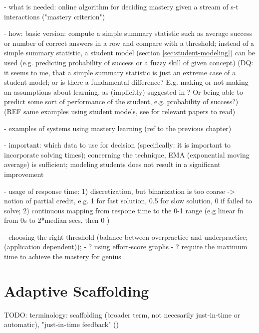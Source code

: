 - what is needed: online algorithm for deciding mastery given a stream of s-t interactions ("mastery criterion")

- how: basic version: compute a simple summary statistic such as average
success or number of correct answers in a row and compare with a threshold;
instead of a simple summary statistic, a student model (section
\ref{sec:student-modeling}) can be used (e.g. predicting probability of success
or a fuzzy skill of given concept)
(DQ: it seems to me, that a simple summary statistic is just an extreme case of
a student model; or is there a fundamental difference? E.g. making or not
making an assumptions about learning, as (implicitly) suggested in \cite{alg.mastery}?
Or being able to predict some sort of performance of the student, e.g. probability of
success?)
(REF same examples using student models, see \cite{alg.mastery} for relevant
papers to read)

- examples of systems using mastery learning (ref to the previous chapter)

- important: which data to use for decision (specifically: it is important to
incorporate solving times); concerning the technique, EMA (exponential moving
average) is sufficient; modeling students does not result in a significant
improvement \cite{alg.mastery}

- usage of response time:
1) discretization, but binarization is too coarse
-> notion of partial credit, e.g. 1 for fast solution, 0.5 for slow solution,
0 if failed to solve;
2) continuous mapping from respone time to the 0-1 range
(e.g linear fn from 0s to 2*median secs, then 0 \cite{alg.mastery})


- choosing the right threshold (balance between overpractice and underpractice;
(application dependent));
- ? using effort-score graphs \cite{alg.mastery}
- ? require the maximum time to achieve the mastery for genius



\section{Adaptive Scaffolding}

TODO: terminology:
  scaffolding (broader term, not necesarily just-in-time or automatic),
  "just-in-time feedback" (\cite{student-models-review-2012})

